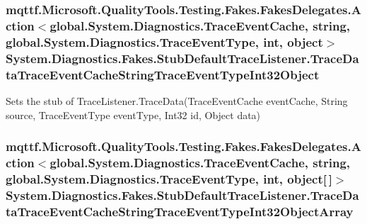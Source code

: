 \hypertarget{class_system_1_1_diagnostics_1_1_fakes_1_1_stub_default_trace_listener_a28705b3ff7d097b2084b794199080479}{
\subsubsection[{Trace\-Data\-Trace\-Event\-Cache\-String\-Trace\-Event\-Type\-Int32\-Object}]{\setlength{\rightskip}{0pt plus 5cm}mqttf.\-Microsoft.\-Quality\-Tools.\-Testing.\-Fakes.\-Fakes\-Delegates.\-Action$<$global.\-System.\-Diagnostics.\-Trace\-Event\-Cache, string, global.\-System.\-Diagnostics.\-Trace\-Event\-Type, int, object$>$ System.\-Diagnostics.\-Fakes.\-Stub\-Default\-Trace\-Listener.\-Trace\-Data\-Trace\-Event\-Cache\-String\-Trace\-Event\-Type\-Int32\-Object}}\label{class_system_1_1_diagnostics_1_1_fakes_1_1_stub_default_trace_listener_a28705b3ff7d097b2084b794199080479}


Sets the stub of Trace\-Listener.\-Trace\-Data(\-Trace\-Event\-Cache event\-Cache, String source, Trace\-Event\-Type event\-Type, Int32 id, Object data)

\hypertarget{class_system_1_1_diagnostics_1_1_fakes_1_1_stub_default_trace_listener_a0b53190626a183a90f83acd65a5121c9}{
\subsubsection[{Trace\-Data\-Trace\-Event\-Cache\-String\-Trace\-Event\-Type\-Int32\-Object\-Array}]{\setlength{\rightskip}{0pt plus 5cm}mqttf.\-Microsoft.\-Quality\-Tools.\-Testing.\-Fakes.\-Fakes\-Delegates.\-Action$<$global.\-System.\-Diagnostics.\-Trace\-Event\-Cache, string, global.\-System.\-Diagnostics.\-Trace\-Event\-Type, int, object\mbox{[}$\,$\mbox{]}$>$ System.\-Diagnostics.\-Fakes.\-Stub\-Default\-Trace\-Listener.\-Trace\-Data\-Trace\-Event\-Cache\-String\-Trace\-Event\-Type\-Int32\-Object\-Array}}\label{class_system_1_1_diagnostics_1_1_fakes_1_1_stub_default_trace_listener_a0b53190626a183a90f83acd65a5121c9}


